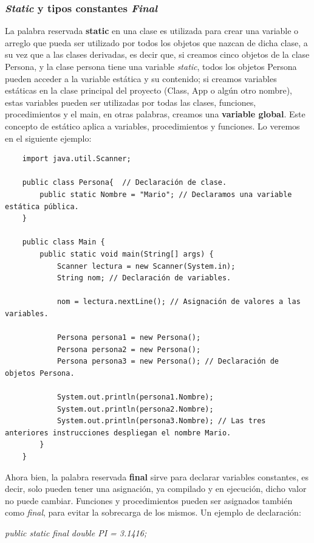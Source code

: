 \subsubsection{\textit{Static} y tipos constantes \textit{Final}}
\hspace{0.55cm}La palabra reservada \textbf{static} en una clase es utilizada para crear una variable o arreglo que pueda ser utilizado por todos los objetos que nazcan de dicha clase, a su vez que a las clases derivadas, es decir que, si creamos cinco objetos de la clase Persona, y la clase persona tiene una variable \textit{static}, todos los objetos Persona pueden acceder a la variable estática y su contenido; si creamos variables estáticas en la clase principal del proyecto (Class, App o algún otro nombre), estas variables pueden ser utilizadas por todas las clases, funciones, procedimientos y el main, en otras palabras, creamos una \textbf{variable global}. Este concepto de estático aplica a variables, procedimientos y funciones. Lo veremos en el siguiente ejemplo:
\begin{lstlisting}
    import java.util.Scanner;
    
    public class Persona{  // Declaración de clase.
        public static Nombre = "Mario"; // Declaramos una variable estática pública.
    }
    
    public class Main {
        public static void main(String[] args) {
            Scanner lectura = new Scanner(System.in);
            String nom; // Declaración de variables.
            
            nom = lectura.nextLine(); // Asignación de valores a las variables.
            
            Persona persona1 = new Persona();
            Persona persona2 = new Persona();
            Persona persona3 = new Persona(); // Declaración de objetos Persona.
            
            System.out.println(persona1.Nombre);
            System.out.println(persona2.Nombre);
            System.out.println(persona3.Nombre); // Las tres anteriores instrucciones despliegan el nombre Mario.
        }
    }
\end{lstlisting}

Ahora bien, la palabra reservada \textbf{final} sirve para declarar variables constantes, es decir, solo pueden tener una asignación, ya compilado y en ejecución, dicho valor no puede cambiar. Funciones y procedimientos pueden ser asignados también como \textit{final}, para evitar la sobrecarga de los mismos. Un ejemplo de declaración:
\begin{center}
	\textit{public static final double PI = 3.1416;}
\end{center}


